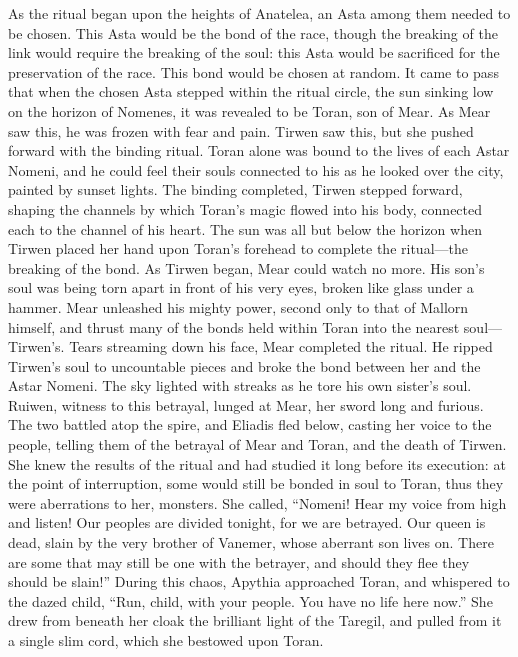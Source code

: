 \documentclass[smalldemyvopaper,11pt,twoside,onecolumn,openright,extrafontsizes]{memoir}
\begin{document}
As the ritual began upon the heights of Anatelea, an Asta among them needed to be chosen. This Asta would be the bond of the race, though the breaking of the link would require the breaking of the soul: this Asta would be sacrificed for the preservation of the race. This bond would be chosen at random. It came to pass that when the chosen Asta stepped within the ritual circle, the sun sinking low on the horizon of Nomenes, it was revealed to be Toran, son of Mear. As Mear saw this, he was frozen with fear and pain. Tirwen saw this, but she pushed forward with the binding ritual. Toran alone was bound to the lives of each Astar Nomeni, and he could feel their souls connected to his as he looked over the city, painted by sunset lights. The binding completed, Tirwen stepped forward, shaping the channels by which Toran’s magic flowed into his body, connected each to the channel of his heart. The sun was all but below the horizon when Tirwen placed her hand upon Toran’s forehead to complete the ritual—the breaking of the bond. As Tirwen began, Mear could watch no more. His son’s soul was being torn apart in front of his very eyes, broken like glass under a hammer. Mear unleashed his mighty power, second only to that of Mallorn himself, and thrust many of the bonds held within Toran into the nearest soul—Tirwen’s. Tears streaming down his face, Mear completed the ritual. He ripped Tirwen’s soul to uncountable pieces and broke the bond between her and the Astar Nomeni. The sky lighted with streaks as he tore his own sister’s soul.
Ruiwen, witness to this betrayal, lunged at Mear, her sword long and furious. The two battled atop the spire, and Eliadis fled below, casting her voice to the people, telling them of the betrayal of Mear and Toran, and the death of Tirwen. She knew the results of the ritual and had studied it long before its execution: at the point of interruption, some would still be bonded in soul to Toran, thus they were aberrations to her, monsters. She called,
“Nomeni! Hear my voice from high and listen! Our peoples are divided tonight, for we are betrayed. Our queen is dead, slain by the very brother of Vanemer, whose aberrant son lives on. There are some that may still be one with the betrayer, and should they flee they should be slain!”
During this chaos, Apythia approached Toran, and whispered to the dazed child,
“Run, child, with your people. You have no life here now.”
She drew from beneath her cloak the brilliant light of the Taregil, and pulled from it a single slim cord, which she bestowed upon Toran.
\end{document}
